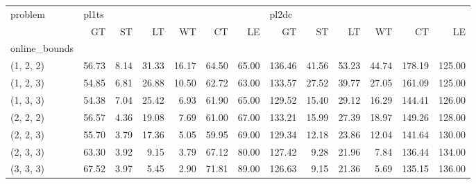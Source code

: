 \begin{tabular}{lrrrrrrrrrrrr}
\toprule
problem & \multicolumn{6}{l}{pl1ts} & \multicolumn{6}{l}{pl2dc} \\
{} &    GT &   ST &    LT &    WT &    CT &    LE &     GT &    ST &    LT &    WT &     CT &     LE \\
online\_bounds &       &      &       &       &       &       &        &       &       &       &        &        \\
\midrule
(1, 2, 2)     & 56.73 & 8.14 & 31.33 & 16.17 & 64.50 & 65.00 & 136.46 & 41.56 & 53.23 & 44.74 & 178.19 & 125.00 \\
(1, 2, 3)     & 54.85 & 6.81 & 26.88 & 10.50 & 62.72 & 63.00 & 133.57 & 27.52 & 39.77 & 27.05 & 161.09 & 125.00 \\
(1, 3, 3)     & 54.38 & 7.04 & 25.42 &  6.93 & 61.90 & 65.00 & 129.52 & 15.40 & 29.12 & 16.29 & 144.41 & 126.00 \\
(2, 2, 2)     & 56.57 & 4.36 & 19.08 &  7.69 & 61.00 & 67.00 & 133.21 & 15.99 & 27.39 & 18.97 & 149.26 & 128.00 \\
(2, 2, 3)     & 55.70 & 3.79 & 17.36 &  5.05 & 59.95 & 69.00 & 129.34 & 12.18 & 23.86 & 12.04 & 141.64 & 130.00 \\
(2, 3, 3)     & 63.30 & 3.92 &  9.15 &  3.79 & 67.12 & 80.00 & 127.42 &  9.28 & 21.96 &  7.84 & 136.44 & 134.00 \\
(3, 3, 3)     & 67.52 & 3.97 &  5.45 &  2.90 & 71.81 & 89.00 & 126.63 &  9.15 & 21.36 &  5.69 & 135.15 & 136.00 \\
\bottomrule
\end{tabular}
